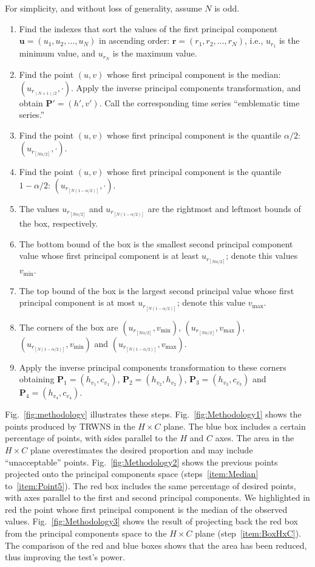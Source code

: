 For simplicity, and without loss of generality, assume $N$ is odd.
\begin{enumerate}
	\item Find the indexes that sort the values of the first principal component $\bm u=(u_1,u_2,\dots,u_N)$ in ascending order: $\bm r=(r_1,r_2,\dots,r_N)$, i.e., $u_{r_1}$ is the minimum value, and $u_{r_N}$ is the maximum value.
	\item\label{item:Median} Find the point $(u,v)$ whose first principal component is the median: $(u_{r_{(N+1)/2}}, \cdot)$. Apply the inverse principal components transformation, and obtain $\bm P'=(h',v')$. Call the corresponding time series ``emblematic time series.''
	\item\label{item:Point1} Find the point $(u,v)$ whose first principal component is the quantile $\alpha/2$: $(u_{r_{[N\alpha/2]}}, \cdot)$.
	\item\label{item:Point2} Find the point $(u,v)$ whose first principal component is the quantile $1-\alpha/2$: $(u_{r_{[N(1-\alpha/2)]}}, \cdot)$.
	\item\label{item:Point3} The values $u_{r_{[N\alpha/2]}}$ and $u_{r_{[N(1-\alpha/2)]}}$ are the rightmost and leftmost bounds of the box, respectively.
	\item\label{item:Point4} The bottom bound of the box is the smallest second principal component value whose first principal component is at least $u_{r_{[N\alpha/2]}}$; denote this values $v_{\min}$.
	\item\label{item:Point5} The top bound of the box is the largest second principal value whose first principal component is at most $u_{r_{[N(1-\alpha/2)]}}$; denote this value $v_{\max}$.
	\item The corners of the box are 
	$(u_{r_{[N\alpha/2]}}, v_{\min})$, 
	$(u_{r_{[N\alpha/2]}}, v_{\max})$, 
	$(u_{r_{[N(1-\alpha/2)]}}, v_{\min})$ and 
	$(u_{r_{[N(1-\alpha/2)]}},v_{\max})$.
	\item\label{item:BoxHxC} Apply the inverse principal components transformation to these corners obtaining $\bm P_1=(h_{v_1}, c_{v_1})$, $\bm P_2=(h_{v_2},h_{v_2})$, $\bm P_3=(h_{v_3}, c_{v_3})$ and $\bm P_4=(h_{v_4},c_{v_4})$.
\end{enumerate}

Fig.~\ref{fig:methodology} illustrates these steps.
%
Fig.~\ref{fig:Methodology1} shows the points produced by TRWNS in the $H\times C$ plane.
The blue box includes a certain percentage of points, with sides parallel to the $H$ and $C$ axes.
The area in the $H\times C$ plane overestimates the desired proportion and may include ``unacceptable'' points.
%
Fig.~\ref{fig:Methodology2} shows the previous points projected onto the principal components space (steps~\ref{item:Median} to~\ref{item:Point5}).
The red box includes the same percentage of desired points, with axes parallel to the first and second principal components.
We highlighted in red the point whose first principal component is the median of the observed values.
%
Fig.~\ref{fig:Methodology3} shows the result of projecting back the red box from the principal components space to the $H\times C$ plane (step~\ref{item:BoxHxC}).
The comparison of the red and blue boxes shows that the area has been reduced, thus improving the test's power.

